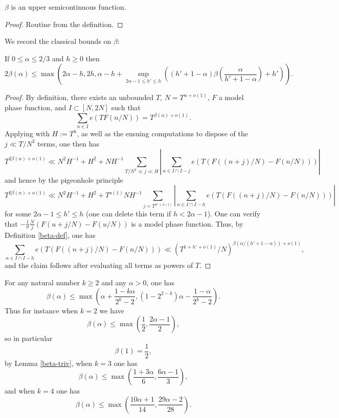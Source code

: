 \begin{lemma}\label{beta-semicts}
\leanok
$\beta$ is an upper semicontinuous function.
\end{lemma}

\begin{proof}\leanok
Routine from the definition.
\end{proof}

We record the classical bounds on $\beta$:

\begin{lemma}\label{vdca-beta} If $0 \leq \alpha \leq 2/3$ and $h \geq 0$ then
$$ 2\beta(\alpha) \leq \max\left( 2\alpha - h, 2h, \alpha - h + \sup_{2\alpha-1 \leq h' \leq h} \left((h'+1-\alpha)\beta\left(\frac{\alpha}{h'+1-\alpha}\right)+h'\right)\right).$$
\end{lemma}

\begin{proof}  By definition, there exists an unbounded $T$, $N = T^{\alpha+o(1)}$, $F$ a model phase function, and $I \subset [N,2N]$ such that
    $$ \sum_{n \in I} e(T F(n/N)) = T^{\beta(\alpha)+o(1)}.$$
Applying \cite[(2.54)]{ivic} with $H := T^h$, as well as the ensuing computations to dispose of the $j \ll T/N^2$ terms, one then has
$$ T^{2\beta(\alpha)+o(1)} \ll N^2 H^{-1} + H^2 + N H^{-1} \sum_{T/N^2 \ll j \ll H} |\sum_{n \in I \cap I-j} e(T (F((n+j)/N) - F(n/N)))|$$
and hence by the pigeonhole principle
$$ T^{2\beta(\alpha)+o(1)} \ll N^2 H^{-1} + H^2 + T^{o(1)} N H^{-1} \sum_{j = T^{h'+o(1)}} |\sum_{n \in I \cap I-h} e(T (F((n+j)/N) - F(n/N)))|$$
for some $2\alpha-1 \leq h' \leq h$ (one can delete this term if $h < 2\alpha-1$).  One can verify that $-\frac{1}{\sigma} \frac{N}{j} (F(u+j/N)-F(u/N))$ is a model phase function.  Thus, by Definition \ref{beta-def}, one has
$$ \sum_{n \in I \cap I-h} e(T (F((n+j)/N) - F(n/N))) \ll (T^{1+h'+o(1)}/N)^{\beta(\alpha/(h'+1-\alpha))+o(1)},$$
and the claim follows after evaluating all terms as powers of $T$.
\end{proof}


\begin{proposition}\label{beta-vdc} For any natural number $k \geq 2$ and any $\alpha>0$, one has
    $$ \beta(\alpha) \leq \max\left( \alpha + \frac{1-k\alpha}{2^k-2}, (1 - 2^{2-k})\alpha - \frac{1-\alpha}{2^k-2}\right).$$
    Thus for instance when $k=2$ we have
    $$ \beta(\alpha) \leq \max\left( \frac{1}{2}, \frac{2\alpha-1}{2} \right),$$
    so in particular
    \begin{equation}\label{beta-1}
        \beta(1)= \frac{1}{2},
    \end{equation}
        by Lemma \ref{beta-triv},
    when $k=3$ one has
    $$ \beta(\alpha) \leq \max\left( \frac{1+3\alpha}{6}, \frac{6\alpha-1}{3} \right),$$
    and when $k=4$ one has
    $$ \beta(\alpha) \leq \max\left( \frac{10\alpha+1}{14}, \frac{29\alpha-2}{28} \right).$$
\end{proposition}

